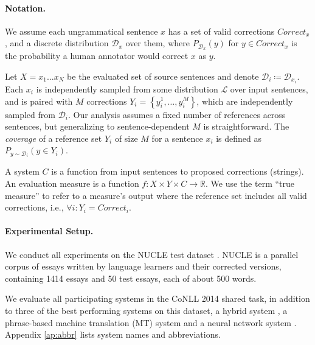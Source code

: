 \documentclass[a4paper]{article}
\begin{document}
\paragraph{Notation.}
We assume each ungrammatical sentence $x$ has a set of valid corrections $Correct_x$,
and a discrete distribution $\mathcal{D}_x$ over them, where $P_{\mathcal{D}_x}(y)$
for $y \in Correct_x$ is the probability a human annotator would correct $x$ as $y$.

Let $X=x_{1}\ldots x_{N}$ be the evaluated set of source sentences and denote $\mathcal{D}_{i}\coloneqq \mathcal{D}_{x_i}$. Each $x_{i}$ is independently sampled from some 
distribution $\mathcal{L}$ over input sentences, 
and is paired with $M$ corrections $Y_i = \left\{y_{i}^{1},\ldots, y_{i}^{M}\right\}$,
which are independently sampled from $\mathcal{D}_{i}$. Our analysis assumes a fixed number of references across sentences, 
but generalizing to sentence-dependent $M$ is straightforward.
The {\it coverage} of a reference set $Y_i$ of size $M$ for a sentence $x_i$ is defined as $P_{y \sim \mathcal{D}_i}(y \in Y_i)$.

A system $C$ is a function from input sentences to proposed corrections (strings).
An evaluation measure is a function $f\colon X \times Y \times C\to \mathbb{R}$. We use the term 
``true measure'' to refer to a measure's output where the reference set includes all valid corrections, 
i.e., $\forall i\colon Y_i=Correct_i$.

\paragraph{Experimental Setup.}\label{par:experimental_setup}
We conduct all experiments on the NUCLE test dataset \cite{dahlmeier2013building}.
NUCLE is a parallel corpus of essays written by language learners and their corrected versions,
containing 1414 essays and 50 test essays, each of about 500 words.

We evaluate all participating systems in the CoNLL 2014 shared task,
in addition to three of the best performing systems on this dataset,
a hybrid system \cite{rozovskaya2016grammatical},
a phrase-based machine translation (MT) system \cite{junczysdowmunt-grundkiewicz:2016:EMNLP2016} 
and a neural network system \cite{xie2016neural}.
Appendix  \ref{ap:abbr} lists system names and abbreviations.

%
\end{document}
